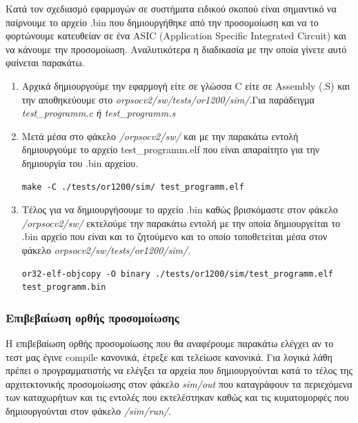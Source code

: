 \documentclass[a4paper,10pt]{article}
\numberwithin{figure}{section}
\numberwithin{table}{section}
\begin{document}
Κατά τον σχεδιασμό εφαρμογών σε συστήματα ειδικού σκοπού είναι σημαντικό να παίρνουμε το αρχείο .bin που δημιουργήθηκε από την προσομοίωση και να το φορτώνουμε κατευθείαν 
σε ένα ASIC (Application Specific Integrated Circuit) και να κάνουμε την προσομοίωση. Αναλυτικότερα η διαδικασία με την οποία γίνετε αυτό φαίνεται παρακάτω. 
\newline

\begin{enumerate}
 \item Αρχικά δημιουργούμε την εφαρμογή είτε σε γλώσσα C είτε σε Assembly (.S) και την αποθηκεύουμε στο \emph{orpsocv2/sw/tests/or1200/sim/}.Για παράδειγμα \newline\emph{test\_programm.c ή test\_programm.s}
 \item Μετά μέσα στο φάκελο \emph{/orpsocv2/sw/} και με την παρακάτω εντολή δημιουργούμε το αρχείο test\_programm.elf που είναι απαραίτητο για την δημιουργία του .bin αρχείου.
\vspace{0.7cm}
\begin{lstlisting}
make -C ./tests/or1200/sim/ test_programm.elf
\end{lstlisting}
\vspace{0.7cm}
 \item Τέλος για να δημιουργήσουμε το αρχείο .bin καθώς βρισκόμαστε στον φάκελο \emph{/orpsocv2/sw/} εκτελούμε την παρακάτω εντολή με την οποία δημιουργείται το .bin αρχείο που είναι και το ζητούμενο και το οποίο τοποθετείται μέσα στον φάκελο \emph{orpsocv2/sw/tests/or1200/sim/}.
\vspace{0.7cm}
\begin{lstlisting}
or32-elf-objcopy -O binary ./tests/or1200/sim/test_programm.elf 
test_programm.bin
\end{lstlisting}
\vspace{0.7cm}

\end{enumerate}

\subsubsection{ Επιβεβαίωση ορθής προσομοίωσης}

Η επιβεβαίωση ορθής προσομοίωσης που θα αναφέρουμε παρακάτω ελέγχει αν το τεστ μας έγινε compile κανονικά, έτρεξε και τελείωσε κανονικά. Για λογικά λάθη πρέπει ο προγραμματιστής να ελέγξει τα αρχεία που δημιουργούνται κατά το τέλος της αρχιτεκτονικής προσομοίωσης στον φάκελο \emph{sim/out} που καταγράφουν τα περιεχόμενα των καταχωρήτων και τις εντολές που εκτελέστηκαν καθώς και τις κυματομορφές που δημιουργούνται στον φάκελο \emph{/sim/run/}.
\newline
\end{document}
